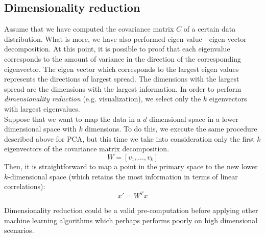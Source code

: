 \subsection{Dimensionality reduction}
Assume that we have computed the covariance matrix $C$ of a certain data distribution.
What is more, we have also performed eigen value - eigen vector decomposition.
At this point, it is possible to proof that each eigenvalue corresponds to the amount
of variance in the direction of the corresponding eigenvector. The eigen vector
which corresponds to the largest eigen values represents the directions of
largest spread. The dimensions with the largest spread are the dimensions with the
largest information. In order to perform \textit{dimensionality reduction} (e.g.
visualization), we select only the $k$ eigenvectors with largest eigenvalues.\\ Suppose
that we want to map the data in a $d$ dimensional space in a lower dimensional space
with $k$ dimensions. To do this, we execute the same procedure described above for
PCA, but this time we take into consideration only the first $k$ eigenvectors of
the covariance matrix decomposition.
\begin{equation*}
	W = [v_{1}, \hdots, v_{k}]
\end{equation*}
Then, it is straightforward to map a point in the primary space to the new lower
$k$-dimensional space (which retains the most information in terms of linear correlations):
\begin{equation*}
	x' = W^{T}x
\end{equation*}

Dimensionality reduction could be a valid pre-computation before applying other
machine learning algorithms which perhaps performs poorly on high dimensional
scenarios.